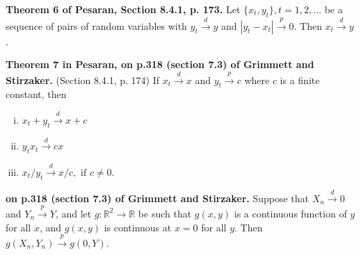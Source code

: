 \begin{theorem}\textbf{Theorem 6 of Pesaran, Section 8.4.1, p. 173.} Let \( \{x_t, y_t\}, t = 1, 2, \ldots\) be a sequence of pairs of random variables with \(y_t \xrightarrow{d} y\) and \(\left| y_t - x_t \right| \xrightarrow{p}  0\). Then \(x_t \xrightarrow{d} y\). \end{theorem}

\begin{theorem}\label{asym.slutsky} \textbf{Theorem 7 in Pesaran, on p.318 (section 7.3) of Grimmett and Stirzaker.} (Section 8.4.1, p. 174)  If \(x_t \xrightarrow{d} x\) and \(y_t \xrightarrow{p} c\) where \(c\) is a finite constant, then

\begin{enumerate}[(i)]

\item \(x_t + y_t \xrightarrow{d} x + c\)

\item \(y_tx_t \xrightarrow{d} cx\)

\item \(x_t/y_t \xrightarrow{d}  x/c, \text{ if } c \neq 0\).

\end{enumerate} \end{theorem}

\begin{theorem} \textbf{on p.318 (section 7.3) of Grimmett and Stirzaker.} Suppose that \(X_n \xrightarrow{d} 0\) and \(Y_n \xrightarrow{p} Y\), and let \(g: \mathbb{R}^2 \to \mathbb{R}\) be such that \(g(x,y)\) is a continuous function of \(y\) for all \(x\), and \(g(x, y)\) is continuous at \(x=0\) for all \(y\). Then \(g(X_n, Y_n) \xrightarrow{p} g(0, Y)\). \end{theorem}


